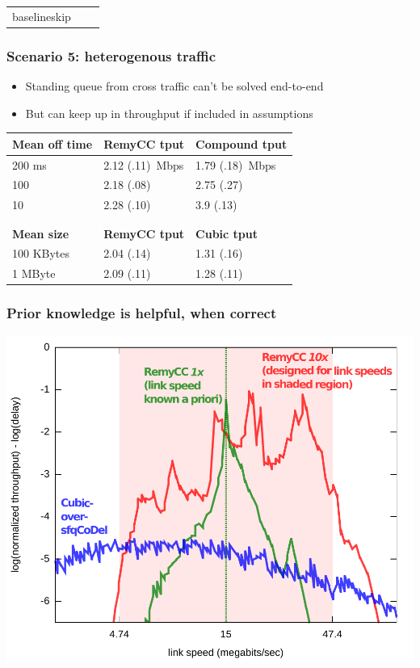 \documentclass[svgnames]{beamer}
\newcommand{\ssline}{\vspace{8 pt}}
\begin{document}
\begin{frame}
\begin{tabular}{lll}
baselineskip}
\end{tabular}

\end{frame}

\begin{frame}
\frametitle{Scenario 5: heterogenous traffic}

\begin{itemize}
\item Standing queue from cross traffic can't be solved end-to-end
\item But can keep up in throughput if included in assumptions
\end{itemize}

\ssline

\begin{tabular}{lll}
\bf Mean off time & \bf RemyCC tput & \bf Compound tput \\
\hline 200 ms & \cellcolor{Green} 2.12 (.11)~Mbps & 1.79 (.18)~Mbps \\
100 & 2.18 (.08)  & \cellcolor{Green} 2.75 (.27) \\
10 & 2.28 (.10) & \cellcolor{Green} 3.9 (.13) \\
\\
\\
\bf Mean size & \bf RemyCC tput & \bf Cubic tput \\
\hline
100 KBytes & \cellcolor{Green} 2.04 (.14) & 1.31 (.16)\\
1 MByte & \cellcolor{Green} 2.09 (.11) & 1.28 (.11) \\
\end{tabular}

\end{frame}

\begin{frame}
\frametitle{Prior knowledge is helpful, when correct}

\begin{centering}
\includegraphics[width=8.5 cm]{spec2.pdf}

\end{centering}

\end{frame}
\end{document}
